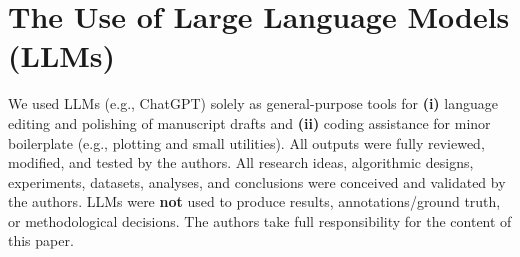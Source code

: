 \documentclass{article} %
\theoremstyle{definition}
\theoremstyle{remark}
\begin{document}
\section{The Use of Large Language Models (LLMs)}
We used LLMs (e.g., ChatGPT) solely as general-purpose tools for
\textbf{(i)} language editing and polishing of manuscript drafts and
\textbf{(ii)} coding assistance for minor boilerplate (e.g., plotting and small utilities).
All outputs were fully reviewed, modified, and tested by the authors.
All research ideas, algorithmic designs, experiments, datasets, analyses, and conclusions
were conceived and validated by the authors.
LLMs were \textbf{not} used to produce results, annotations/ground truth, or methodological decisions.
The authors take full responsibility for the content of this paper.
\end{document}
